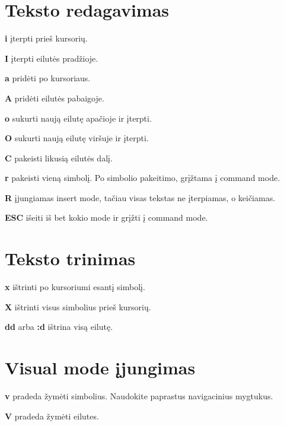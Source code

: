 \documentclass[11pt,a4paper]{article}
\begin{document}
  \section{Teksto redagavimas}

  \begin{multicols}{2}

    \textbf{i} įterpti prieš kursorių.

    \textbf{I} įterpti eilutės pradžioje.

    \textbf{a} pridėti po kursoriaus.

    \textbf{A} pridėti eilutės pabaigoje.

    \textbf{o} sukurti naują eilutę apačioje ir įterpti.

    \textbf{O} sukurti naują eilutę viršuje ir įterpti.

    \textbf{C} pakeisti likusią eilutės dalį.

    \textbf{r} pakeisti vieną simbolį. Po simbolio pakeitimo,
    grįžtama į command mode.

    \textbf{R} įjungiamas insert mode, tačiau visas tekstas ne
    įterpiamas, o keičiamas.

    \textbf{ESC} išeiti iš bet kokio mode ir grįžti į command mode.

  \end{multicols}

  \section{Teksto trinimas}

  \begin{multicols}{2}

    \textbf{x} ištrinti po kursoriumi esantį simbolį.

    \textbf{X} ištrinti visus simbolius prieš kursorių.

    \textbf{dd} arba \textbf{:d} ištrina visą eilutę.

  \end{multicols}

  \section{Visual mode įjungimas}

  \begin{multicols}{2}

    \textbf{v} pradeda žymėti simbolius. Naudokite paprastus
    navigacinius mygtukus.

    \textbf{V} pradeda žymėti eilutes.

  \end{multicols}
\end{document}
